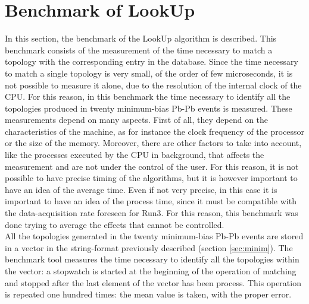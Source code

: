 \section{Benchmark of LookUp}
In this section, the benchmark of the LookUp algorithm is described. This benchmark consists of the measurement of the time necessary to match a topology with the corresponding entry in the database. Since the time necessary to match a single topology is very small, of the order of few microseconds, it is not possible to measure it alone, due to the resolution of the internal clock of the CPU. For this reason, in this benchmark the time necessary to identify all the topologies produced in twenty minimum-bias Pb-Pb events is measured. These measurements depend on many aspects. First of all, they depend on the characteristics of the machine, as for instance the clock frequency of the processor or the size of the memory. Moreover, there are other factors to take into account, like the processes executed by the CPU in background, that affects the measurement and are not under the control of the user. For this reason, it is not possible to have precise timing of the algorithms, but it is however important to have an idea of the average time. Even if not very precise, in this case it is important to have an idea of the process time, since it must be compatible with the data-acquisition rate foreseen for Run3. For this reason, this benchmark was done trying to average the effects that cannot be controlled.\\
All the topologies generated in the twenty minimum-bias Pb-Pb events are stored in a vector in the string-format previously described (section \ref{sec:minim}). The benchmark tool measures the time necessary to identify all the topologies within the vector: a stopwatch is started at the beginning of the operation of matching and stopped after the last element of the vector has been process. This operation is repeated one hundred times: the mean value is taken, with the proper error.
%
